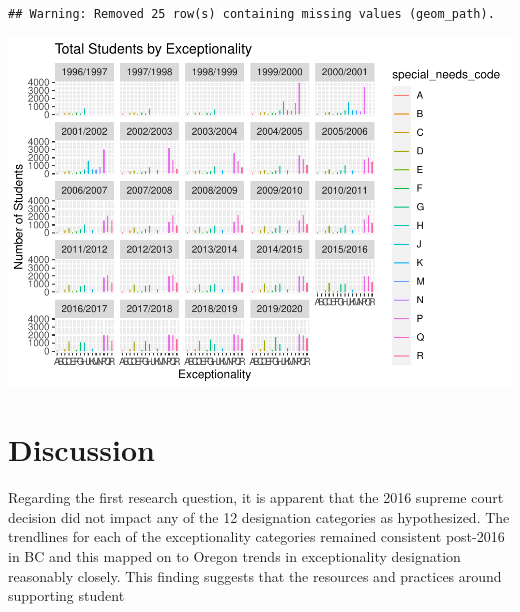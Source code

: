 \documentclass[
  english,
  man]{apa6}
\begin{document}
\begin{verbatim}
## Warning: Removed 25 row(s) containing missing values (geom_path).
\end{verbatim}

\includegraphics{Final_project_files/figure-latex/urban play-2.pdf}

\hypertarget{discussion}{%
\section{Discussion}\label{discussion}}

Regarding the first research question, it is apparent that the 2016 supreme court decision did not impact any of the 12 designation categories as hypothesized. The trendlines for each of the exceptionality categories remained consistent post-2016 in BC and this mapped on to Oregon trends in exceptionality designation reasonably closely. This finding suggests that the resources and practices around supporting student
\end{document}
